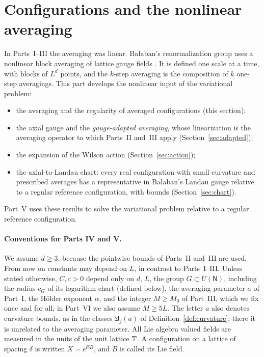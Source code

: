 \section{Configurations and the nonlinear averaging}\label{sec:averaging}

In Parts~I--III the averaging was linear. Ba\l aban's renormalization group uses a nonlinear block averaging of lattice gauge fields \cite{BalAvg}. It is defined one scale at a time, with blocks of $L^d$ points, and the $k$-step averaging is the composition of $k$ one-step averagings. This part develops the nonlinear input of the variational problem:
\begin{itemize}
\item the averaging and the regularity of averaged configurations (this section);
\item the axial gauge and the \emph{gauge-adapted averaging}, whose linearization is the averaging operator to which Parts~II and~III apply (Section~\ref{sec:adapted});
\item the expansion of the Wilson action (Section~\ref{sec:action});
\item the axial-to-Landau chart: every real configuration with small curvature and prescribed averages has a representative in Ba\l aban's Landau gauge relative to a regular reference configuration, with bounds (Section~\ref{sec:chart}).
\end{itemize}
Part~V uses these results to solve the variational problem relative to a regular reference configuration.

\paragraph{Conventions for Parts IV and V.} We assume $d\ge3$, because the pointwise bounds of Parts~II and~III are used. From now on constants may depend on $L$, in contrast to Parts~I--III. Unless stated otherwise, $C,c>0$ depend only on $d$, $L$, the group $G\subset U(\mathsf N)$, including the radius $c_G$ of its logarithm chart (defined below), the averaging parameter $a$ of Part~I, the H\"older exponent $\alpha$, and the integer $M\ge M_0$ of Part~III, which we fix once and for all; in Part~VI we also assume $M\ge5L$. The letter $a$ also denotes curvature bounds, as in the classes $\mathfrak U_j(a)$ of Definition~\ref{def:curvature}; there it is unrelated to the averaging parameter. All Lie algebra valued fields are measured in the units of the unit lattice $\mathbb T$. A configuration on a lattice of spacing $\delta$ is written $X=e^{\ii\delta B}$, and $B$ is called its Lie field.


